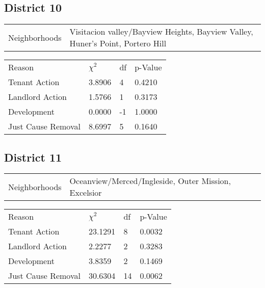 \documentclass[]{article}
\begin{document}
\subsection{District 10}

\begin {table}[h]
\centering
\begin{tabular}{l | l}
	Neighborhoods & Visitacion valley/Bayview Heights, Bayview Valley, Huner's Point, Portero Hill
\end{tabular}
\begin{tabular}{l | l | l | l}
	
	Reason				 &  $\chi ^{2}$ & df & p-Value \\
	Tenant Action 		   &  3.8906  &  4  & 0.4210 \\
	Landlord Action	       &  1.5766  &  1  & 0.3173 \\
	Development			   &  0.0000  &  -1  & 1.0000 \\
	Just Cause Removal	   &  8.6997  &  5  & 0.1640 \\
\end{tabular} \newline
\end{table}
\FloatBarrier



\subsection{District 11}

\begin{table}[h]
	\centering
	\begin{tabular}{l | l}
		Neighborhoods &  Oceanview/Merced/Ingleside, Outer Mission, Excelsior  \\
	\end{tabular}
\end{table}
\FloatBarrier

\begin {table}[h]
\centering
\begin{tabular}{l | l | l | l}
	
	Reason				 &  $\chi ^{2}$ & df & p-Value \\
	Tenant Action 		   &  23.1291  &  8  & 0.0032 \\
	Landlord Action	       &   2.2277 &  2  & 0.3283 \\
	Development			   &  3.8359  &  2  & 0.1469 \\
	Just Cause Removal	   &  30.6304  &  14  & 0.0062 \\
\end{tabular} \newline
\end{table}
\FloatBarrier
\end{document}
